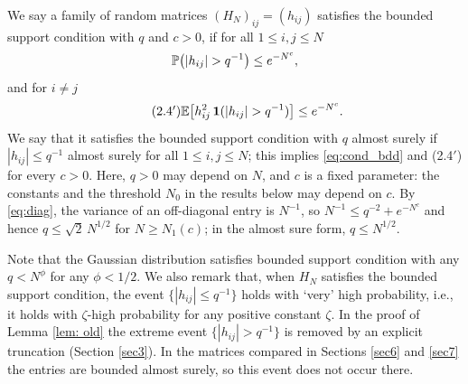  \begin{defn} \label{cond:bdd}
We say a family of random matrices $(H_N)_{ij} = (h_{ij})$ satisfies the bounded support condition with $q$ and $c>0$, if for all $1 \leq i, j \leq N$
\begin{equation} \label{eq:cond_bdd}
\mathbb{P} \big( |h_{ij}| > q^{-1} \big) \leq e^{-N^c},
\end{equation}
and for $i \neq j$
\begin{equation} \tag{2.4$'$}
\mathbb{E} \big[ h_{ij}^2 \, \mathbf{1} ( |h_{ij}| > q^{-1} ) \big] \leq e^{-N^c}.
\end{equation}
We say that it satisfies the bounded support condition with $q$ almost surely if $|h_{ij}| \leq q^{-1}$ almost surely for all $1 \leq i, j \leq N$; this implies \eqref{eq:cond_bdd} and (2.4$'$) for every $c>0$. Here, $q>0$ may depend on $N$, and $c$ is a fixed parameter: the constants and the threshold $N_0$ in the results below may depend on $c$. By \eqref{eq:diag}, the variance of an off-diagonal entry is $N^{-1}$, so $N^{-1} \leq q^{-2} + e^{-N^c}$ and hence $q \leq \sqrt 2\, N^{1/2}$ for $N \geq N_1(c)$; in the almost sure form, $q \leq N^{1/2}$.
\end{defn}

Note that the Gaussian distribution satisfies bounded support condition with any $q < N^{\phi}$ for any $\phi < 1/2$. We also remark that, when $H_N$ satisfies the bounded support condition, the event $\{ |h_{ij}| \leq q^{-1} \}$ holds with `very' high probability, i.e., it holds with $\zeta$-high probability for any positive constant $\zeta$. In the proof of Lemma \ref{lem: old} the extreme event $\{ |h_{ij}| > q^{-1} \}$ is removed by an explicit truncation (Section \ref{sec3}). In the matrices compared in Sections \ref{sec6} and \ref{sec7} the entries are bounded almost surely, so this event does not occur there.


  
